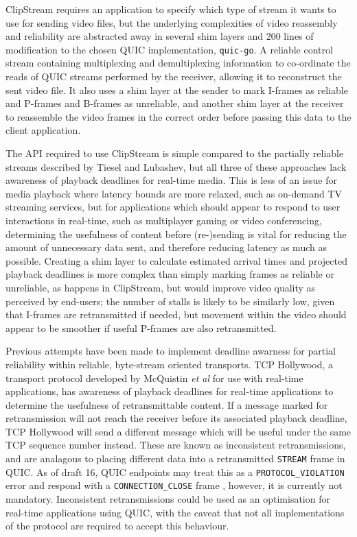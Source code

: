 \documentclass{mprop}
\begin{document}
ClipStream requires an application to specify which type of stream it wants to use for sending video files, but the underlying complexities of video reassembly and reliability are abstracted away in several shim layers and 200 lines of modification to the chosen QUIC implementation, \texttt{quic-go}. A reliable control stream containing multiplexing and demultiplexing information to co-ordinate the reads of QUIC streams performed by the receiver, allowing it to reconstruct the sent video file. It also uses a shim layer at the sender to mark I-frames as reliable and P-frames and B-frames as unreliable, and another shim layer at the receiver to reassemble the video frames in the correct order before passing this data to the client application.

The API required to use ClipStream is simple compared to the partially reliable streams described by Tiesel and Lubashev, but all three of these approaches lack awareness of playback deadlines for real-time media. This is less of an issue for media playback where latency bounds are more relaxed, such as on-demand TV streaming services, but for applications which should appear to respond to user interactions in real-time, such as multiplayer gaming or video conferencing, determining the usefulness of content before (re-)sending is vital for reducing the amount of unnecessary data sent, and therefore reducing latency as much as possible. Creating a shim layer to calculate estimated arrival times and projected playback deadlines is more complex than simply marking frames as reliable or unreliable, as happens in ClipStream, but would improve video quality as perceived by end-users; the number of stalls is likely to be similarly low, given that I-frames are retransmitted if needed, but movement within the video should appear to be smoother if useful P-frames are also retransmitted.

Previous attempts have been made to implement deadline awarness for partial reliability within reliable, byte-stream oriented transports. TCP Hollywood, a transport protocol developed by McQuistin \textit{et al} \cite{McQuistin2016} for use with real-time applications, has awareness of playback deadlines for real-time applications to determine the usefulness of retransmittable content. If a message marked for retransmission will not reach the receiver before its associated playback deadline, TCP Hollywood will send a different message which will be useful under the same TCP sequence number instead. These are known as inconsistent retransmissions, and are analagous to placing different data into a retransmitted \texttt{STREAM} frame in QUIC. As of draft 16, QUIC endpoints may treat this as a \texttt{PROTOCOL\_VIOLATION} error and respond with a \texttt{CONNECTION\_CLOSE} frame \cite{quic-transport-16}, however, it is currently not mandatory. Inconsistent retransmissions could be used as an optimisation for real-time applications using QUIC, with the caveat that not all implementations of the protocol are required to accept this behaviour.
\end{document}
